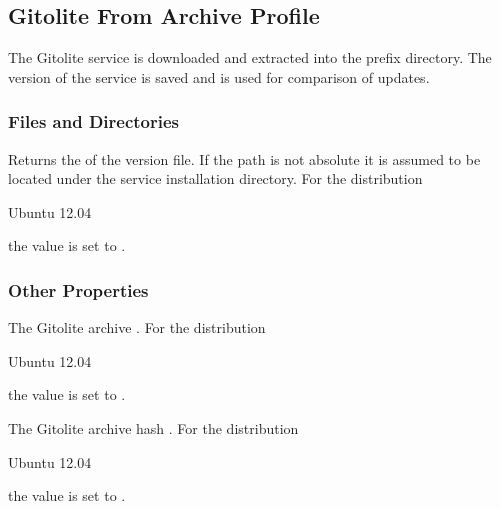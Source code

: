 \label{sec:gitolite_fromarchive_profile}
\subsection{Gitolite From Archive Profile}

The Gitolite service is downloaded and extracted into the prefix directory.
The version of the service is saved and is used for comparison of updates.

\subsubsection{Files and Directories}


Returns the  of the version file. If the path is not
absolute it is assumed to be located under the service
installation directory.
For the distribution
\begin{inparaitem}
\item[\TheDistribution{ubuntu}] Ubuntu 12.04
\end{inparaitem}
the value is set to .

\subsubsection{Other Properties}


The Gitolite archive .
For the distribution
\begin{inparaitem}
\item[\TheDistribution{ubuntu}] Ubuntu 12.04
\end{inparaitem}
the value is set to .


The Gitolite archive hash .
For the distribution
\begin{inparaitem}
\item[\TheDistribution{ubuntu}] Ubuntu 12.04
\end{inparaitem}
the value is set to .

